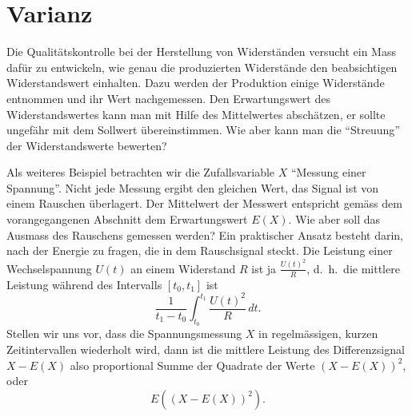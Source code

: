 \section{Varianz}\label{section-varianz}
Die Qualitätskontrolle bei der Herstellung von Widerständen versucht
ein Mass dafür zu entwickeln, wie genau die produzierten Widerstände
den beabsichtigen Widerstandswert einhalten. 
Dazu werden der Produktion einige Widerstände entnommen und ihr Wert
nachgemessen.
Den Erwartungswert des Widerstandswertes kann man mit
Hilfe des Mittelwertes abschätzen, er sollte ungefähr mit dem Sollwert
übereinstimmen.
Wie aber kann man die ``Streuung'' der Widerstandswerte
bewerten?

Als weiteres Beispiel betrachten wir die Zufallsvariable $X$
``Messung einer Spannung''.
Nicht jede Messung ergibt den gleichen Wert,
das Signal ist von einem Rauschen überlagert.
Der Mittelwert der
Messwert entspricht gemäss dem vorangegangenen Abschnitt dem Erwartungswert
$E(X)$.
Wie aber soll das Ausmass des Rauschens gemessen werden?
Ein praktischer Ansatz besteht darin, nach der Energie zu fragen, die
in dem Rauschsignal steckt.
Die Leistung einer Wechselspannung $U(t)$
an einem Widerstand $R$ ist ja
$\frac{U(t)^2}R$, d.~h.~die mittlere Leistung während des Intervalls $[t_0,t_1]$ 
ist
\[
\frac1{t_1-t_0}\int_{t_0}^{t_1}\frac{U(t)^2}R\,dt.
\]
Stellen wir uns vor, dass die Spannungsmessung $X$ in regelmässigen, kurzen
Zeitintervallen wiederholt wird, dann ist die mittlere Leistung
des Differenzsignal $X-E(X)$ also proportional Summe der Quadrate
der Werte $(X-E(X))^2$, oder
\[
E((X-E(X))^2).
\]

